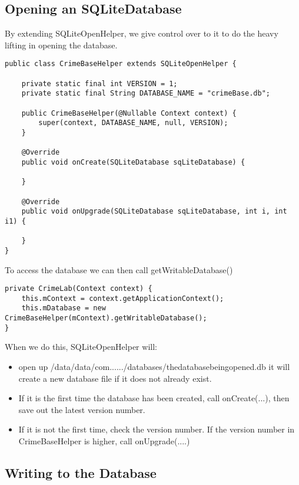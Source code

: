 \documentclass[]{article}
\begin{document}
\subsection{Opening an SQLiteDatabase}
By extending SQLiteOpenHelper, we give control over to it to do the heavy lifting in opening the database.
\begin{lstlisting}
public class CrimeBaseHelper extends SQLiteOpenHelper {

	private static final int VERSION = 1;
	private static final String DATABASE_NAME = "crimeBase.db";

	public CrimeBaseHelper(@Nullable Context context) {
		super(context, DATABASE_NAME, null, VERSION);
	}

	@Override
	public void onCreate(SQLiteDatabase sqLiteDatabase) {

	}

	@Override
	public void onUpgrade(SQLiteDatabase sqLiteDatabase, int i, int i1) {

	}
}
\end{lstlisting}
To access the database we can then call getWritableDatabase()
\begin{lstlisting}
private CrimeLab(Context context) {
	this.mContext = context.getApplicationContext();
	this.mDatabase = new CrimeBaseHelper(mContext).getWritableDatabase();
}
\end{lstlisting}
When we do this, SQLiteOpenHelper will:
\begin{itemize}
	\item open up /data/data/com....../databases/thedatabasebeingopened.db
	\subitem it will create a new database file if it does not already exist.
	
	\item If it is the first time the database has been created, call onCreate(...), then save out the latest version number.
	
	\item If it is not the first time, check the version number.
	\subitem If the version number in CrimeBaseHelper is higher, call onUpgrade(....) 
\end{itemize}

\subsection{Writing to the Database}
\end{document}
